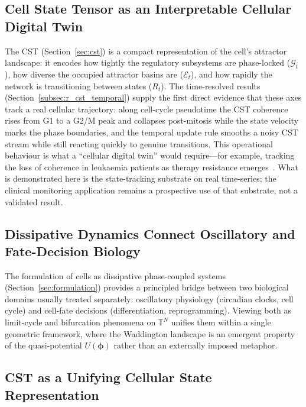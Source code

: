 \documentclass[preprint,12pt,amsmath,amssymb,superscriptaddress,floatfix]{revtex4-2}
\newcommand{\torus}{\mathbb{T}}
\begin{document}
\subsection{Cell State Tensor as an Interpretable Cellular Digital Twin}

The CST (Section~\ref{sec:cst}) is a compact representation of the cell's
attractor landscape: it encodes how tightly the regulatory subsystems are
phase-locked ($\mathcal{G}_t$), how diverse the occupied attractor basins are
($\mathcal{E}_t$), and how rapidly the network is transitioning between states
($R_t$). The time-resolved results (Section~\ref{subsec:r_cst_temporal})
supply the first direct evidence that these axes track a real cellular
trajectory: along cell-cycle pseudotime the CST coherence rises from G1 to a
G2/M peak and collapses post-mitosis while the state velocity marks the phase
boundaries, and the temporal update rule smooths a noisy CST stream while still
reacting quickly to genuine transitions. This operational behaviour is what a
``cellular digital twin'' would require---for example, tracking the loss of
coherence in leukaemia patients as therapy resistance
emerges~\cite{ref_huang2005}. What is demonstrated here is the state-tracking
substrate on real time-series; the clinical monitoring application remains a
prospective use of that substrate, not a validated result.

\subsection{Dissipative Dynamics Connect Oscillatory and Fate-Decision Biology}

The formulation of cells as dissipative phase-coupled systems
(Section~\ref{sec:formulation}) provides a principled bridge between two
biological domains usually treated separately: oscillatory physiology
(circadian clocks, cell cycle) and cell-fate decisions (differentiation,
reprogramming).  Viewing both as limit-cycle and bifurcation phenomena
on $\torus^N$ unifies them within a single geometric framework, where
the Waddington landscape is an emergent property of the quasi-potential
$U(\boldsymbol{\phi})$ rather than an externally imposed metaphor.

\subsection{CST as a Unifying Cellular State Representation}
\end{document}
